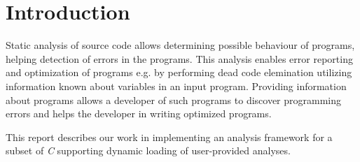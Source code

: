 \section{Introduction}

Static analysis of source code allows determining possible behaviour of programs, helping detection of errors in the programs. This analysis enables error reporting and optimization of programs e.g. by performing dead code elemination utilizing information known about variables in an input program. Providing information about programs allows a developer of such programs to discover programming errors and helps the developer in writing optimized programs.  

\newpar This report describes our work in implementing an analysis framework for a subset of \textit{C} supporting dynamic loading of user-provided analyses. 



